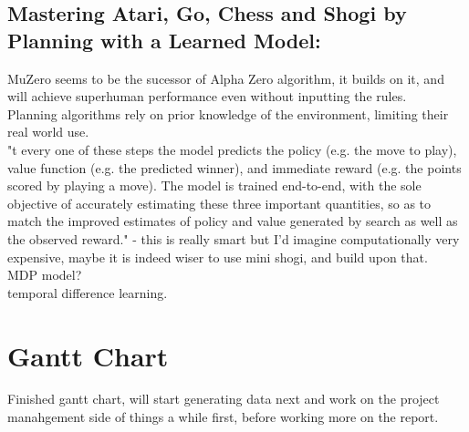 \documentclass [12pt]{article}
\begin{document}
  
  \subsection{Mastering Atari, Go, Chess and Shogi by Planning with a
Learned Model:}

  MuZero seems to be the sucessor of Alpha Zero algorithm, it builds on it, and will achieve superhuman performance even 
  without inputting the rules. \\ 

  Planning algorithms rely on prior knowledge of the environment, limiting their real world use. \\ 

  "t every one of these steps the model predicts the
policy (e.g. the move to play), value function (e.g. the predicted winner), and immediate reward (e.g. the points
scored by playing a move). The model is trained end-to-end, with the sole objective of accurately estimating these
three important quantities, so as to match the improved estimates of policy and value generated by search as well
as the observed reward." - this is really smart but I'd imagine computationally very expensive, maybe it is indeed wiser to 
use mini shogi, and build upon that.\\ 

MDP model?\\

temporal difference learning.\\ 




\subsection{}
























\section{Gantt Chart}

Finished gantt chart, will start generating data next and work on the project manahgement side of things a while first, before working more on the report.\\ 
\end{document}
